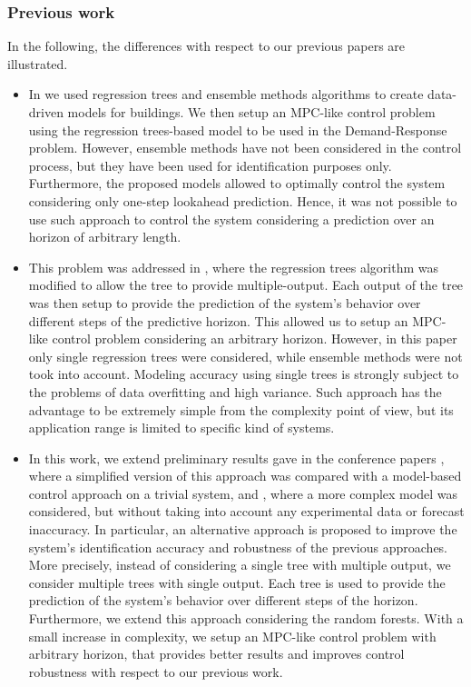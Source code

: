 \textcolor[rgb]{0,0,1}{
\subsubsection{Previous work}\label{SSS:PreviousWork}
In the following, the differences with respect to our previous papers are illustrated.
\begin{itemize}
	\item In \cite{Behl2016} we used regression trees and ensemble methods algorithms to create data-driven models for buildings. 
	We then setup an MPC-like control problem using the regression trees-based model to be used in the Demand-Response problem.
	However, ensemble methods have not been considered in the control process, but they have been used for identification purposes only.
	Furthermore, the proposed models allowed to optimally control the system considering only one-step lookahead prediction.
	Hence, it was not possible to use such approach to control the system considering a prediction over an horizon of arbitrary length.
	\item This problem was addressed in \cite{Jain2017TCPS}, where the regression trees algorithm was modified to allow the tree to provide multiple-output.
	Each output of the tree was then setup to provide the prediction of the system's behavior over different steps of the predictive horizon.
	This allowed us to setup an MPC-like control problem considering an arbitrary horizon.
	However, in this paper only single regression trees were considered, while ensemble methods were not took into account.
	Modeling accuracy using single trees is strongly subject to the problems of data overfitting and high variance.
	Such approach has the advantage to be extremely simple from the complexity point of view, but its application range is limited to specific kind of systems.
	\item In this work, we extend preliminary results gave in the conference papers \cite{JainACC2017}, where a simplified version of this approach was compared with a model-based control approach on a trivial system, and \cite{JainCDC2017}, where a more complex model was considered, but without taking into account any experimental data or forecast inaccuracy.
	In particular, an alternative approach is proposed to improve the system's identification accuracy and robustness of the previous approaches.
	More precisely, instead of considering a single tree with multiple output, we consider multiple trees with single output.
	Each tree is used to provide the prediction of the system's behavior over different steps of the horizon.
	Furthermore, we extend this approach considering the random forests.
	With a small increase in complexity, we setup an MPC-like control problem with arbitrary horizon, that provides better results and improves control robustness with respect to our previous work.
\end{itemize}
}

